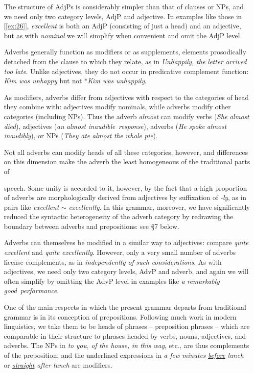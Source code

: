 The structure of AdjPs is considerably simpler than that of clauses or NPs, and we need only two category levels, AdjP and adjective. In examples like those in [\ref{ex:26}], \textit{excellent} is both an AdjP (consisting of just a head) and an adjective, but as with \textit{nominal} we will simplify when convenient and omit the AdjP level.

Adverbs generally function as modifiers or as supplements, elements prosodically detached from the clause to which they relate, as in \textit{Unhappily, the letter arrived too late}. Unlike adjectives, they do not occur in predicative complement function: \textit{Kim was unhappy} but not *\textit{Kim was unhappily}.

As modifiers, adverbs differ from adjectives with respect to the categories of head they combine with: adjectives modify nominals, while adverbs modify other categories (including NPs). Thus the adverb \textit{almost} can modify verbs (\textit{She} \ob\textit{almost died}\cb), adjectives (\textit{an} \ob\textit{almost inaudible}\cb\ \textit{response}), adverbs (\textit{He spoke} \ob\textit{almost inaudibly}\cb), or NPs (\textit{They ate} \ob\textit{almost the whole pie}\cb).

Not all adverbs can modify heads of all these categories, however, and differences on this dimension make the adverb the least homogeneous of the traditional parts of

\newpage

\noindent speech. Some unity is accorded to it, however, by the fact that a high proportion of adverbs are morphologically derived from adjectives by suffixation of \textit{-ly}, as in pairs like \textit{excellent} $\sim$ \textit{excellently}. In this grammar, moreover, we have significantly reduced the syntactic heterogeneity of the adverb category by redrawing the boundary between adverbs and prepositions: see §7 below.

Adverbs can themselves be modified in a similar way to adjectives: compare \textit{quite excellent} and \textit{quite excellently}. However, only a very small number of adverbs license complements, as in \textit{independently of such considerations}. As with adjectives, we need only two category levels, AdvP and adverb, and again we will often simplify by omitting the AdvP level in examples like \textit{a} \ob\textit{remarkably good}\cb\ \textit{performance}.


One of the main respects in which the present grammar departs from traditional grammar is in its conception of prepositions. Following much work in modern linguistics, we take them to be heads of phrases -- preposition phrases -- which are comparable in their structure to phrases headed by verbs, nouns, adjectives, and adverbs. The NPs in \textit{to you, of the house, in this way}, etc., are thus complements of the preposition, and the underlined expressions in \textit{a few minutes \uline{before} lunch} or \textit{\uline{straight} after lunch} are modifiers.

